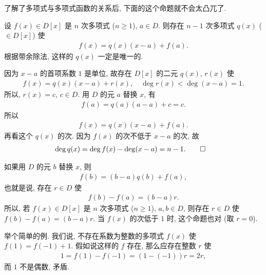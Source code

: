 了解了多项式与多项式函数的关系后, 下面的这个命题就不会太凸兀了.

\begin{proposition}
    设 $f(x) \in D[x]$ 是 $n$ 次多项式 ($n \geq 1$), $a \in D$. 则存在 $n-1$ 次多项式 $q(x)$ ($\in D[x]$) 使
    \begin{align*}
        f(x) = q(x) (x-a) + f(a).
    \end{align*}
    根据带余除法, 这样的 $q(x)$ 一定是唯一的.
\end{proposition}

\begin{pf}
    因为 $x-a$ 的首项系数 $1$ 是单位, 故存在 $D[x]$ 的二元 $q(x)$, $r(x)$ 使
    \begin{align*}
        f(x) = q(x) (x-a) + r(x), \quad \deg r(x) < \deg (x-a) = 1.
    \end{align*}
    所以, $r(x) = c$, $c \in D$. 用 $D$ 的元 $a$ 替换 $x$, 有
    \begin{align*}
        f(a) = q(a) (a-a) + c = c.
    \end{align*}
    所以
    \begin{align*}
        f(x) = q(x) (x-a) + f(a).
    \end{align*}
    再看这个 $q(x)$ 的次. 因为 $f(x)$ 的次不低于 $x-a$ 的次, 故
    \begin{align*}
         & \deg q(x) = \deg f(x) - \deg (x-a) = n-1. \qedhere
    \end{align*}
\end{pf}

\begin{remark}
    如果用 $D$ 的元 $b$ 替换 $x$, 则
    \begin{align*}
        f(b) = (b-a)q(b) + f(a),
    \end{align*}
    也就是说, 存在 $r \in D$ 使
    \begin{align*}
        f(b) - f(a) = (b-a)r.
    \end{align*}
    所以, 若 $f(x) \in D[x]$ 是 $n$ 次多项式 ($n \geq 1$), $a,b \in D$, 则存在 $r \in D$ 使 $f(b) - f(a) = (b-a)r$. 当 $f(x)$ 的次低于 $1$ 时, 这个命题也对 (取 $r=0$).

    举个简单的例. 我们说, 不存在系数为整数的多项式 $f(x)$ 使 $f(1) = f(-1) + 1$. 假如说这样的 $f$ 存在, 那么应存在整数 $r$ 使
    \begin{align*}
        1 = f(1) - f(-1) = (1 - (-1))r = 2r,
    \end{align*}
    而 $1$ 不是偶数, 矛盾.
\end{remark}

